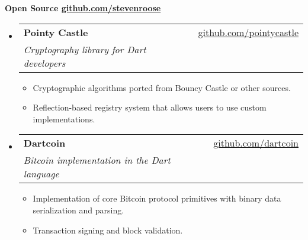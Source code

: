 \documentclass[letterpaper,11pt]{article}
\makeatletter
\newcommand{\resheading}[1]{{\large \colorbox{mygrey}{\begin{minipage}{\textwidth}{\textbf{#1 \vphantom{p\^{E}}}}\end{minipage}}}}
\newcommand{\ressubheading}[4]{
\begin{tabular*}{7.3in}{l@{\extracolsep{\fill}}r}
		\textbf{#1} & #2 \\
		\textit{#3} & \textit{#4} \\
\end{tabular*}\vspace{-6pt}}
\newcommand{\resitem}[1]{\item #1 \vspace{-2pt}}
\makeatother
\begin{document}
\resheading{Open Source \hfill
\href{https://github.com/stevenroose}{github.com/stevenroose}}
\begin{itemize}[leftmargin=*]

\item[]
	\ressubheading{Pointy Castle}{\href{https://github.com/pointycastle}{github.com/pointycastle}}{Cryptography library for Dart developers}{ }
	\begin{itemize}
		\resitem{Cryptographic algorithms ported from Bouncy Castle or other sources.}
		\resitem{Reflection-based registry system that allows users to use custom implementations.}
	\end{itemize}

\item[]
	\ressubheading{Dartcoin}{\href{https://github.com/dartcoin}{github.com/dartcoin}}{Bitcoin implementation in the Dart language}{ }
	\begin{itemize}
		\resitem{Implementation of core Bitcoin protocol primitives with binary data serialization and parsing.}
		\resitem{Transaction signing and block validation.}
	\end{itemize}

\end{itemize}

\newpage
\end{document}
